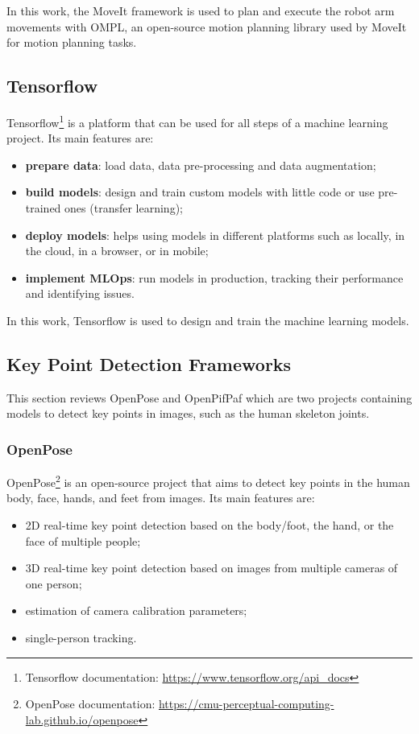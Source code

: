 In this work, the MoveIt framework is used to plan and execute the robot arm movements with OMPL, an open-source motion planning library used by MoveIt for motion planning tasks.

\subsection{Tensorflow}

Tensorflow\footnote{Tensorflow documentation: \url{https://www.tensorflow.org/api_docs}} is a platform that can be used for all steps of a machine learning project. Its main features are:
\begin{itemize}
    \item \textbf{prepare data}: load data, data pre-processing and data augmentation;
    \item \textbf{build models}: design and train custom models with little code or use pre-trained ones (transfer learning);
    \item \textbf{deploy models}: helps using models in different platforms such as locally, in the cloud, in a browser, or in mobile;
    \item \textbf{implement MLOps}: run models in production, tracking their performance and identifying issues.
\end{itemize}

In this work, Tensorflow is used to design and train the machine learning models.

\subsection{Key Point Detection Frameworks}
\label{section:keypointdetection}

This section reviews OpenPose and OpenPifPaf which are two projects containing models to detect key points in images, such as the human skeleton joints.

\subsubsection{OpenPose}

OpenPose\cite{Cao2021,Simon2017,Cao2018,Wei2016}\footnote{OpenPose documentation: \url{https://cmu-perceptual-computing-lab.github.io/openpose}} is an open-source project that aims to detect key points in the human body, face, hands, and feet from images. Its main features are:

\begin{itemize}
    \item 2D real-time key point detection based on the body/foot, the hand, or the face of multiple people;
    \item 3D real-time key point detection based on images from multiple cameras of one person;
    \item estimation of camera calibration parameters;
    \item single-person tracking.
\end{itemize}


